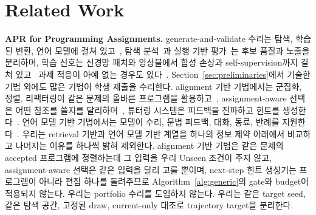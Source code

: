\documentclass[10pt,conference]{IEEEtran}
\begin{document}
\section{Related Work}
\label{sec:related}
\noindent\textbf{APR for Programming Assignments.} generate-and-validate 수리는 탐색, 학습된 변환, 언어 모델에 걸쳐 있고~\cite{gazzola2019automatic,monperrus2018automatic,weimer2009automatically,legoues2012genprog}, 탐색 분석~\cite{qi2014strength}과 실행 기반 평가~\cite{haque2023fixeval,chen2021evaluating}는 후보 품질과 노출을 분리하며, 학습 신호는 신경망 패치와 앙상블에서 합성 손상과 self-supervision까지 걸쳐 있고~\cite{tufano2019empirical,lutellier2020coconut,yasunaga2021break,ye2022selfapr} 과제 적응이 아예 없는 경우도 있다~\cite{xia2022less,jiang2023impact}. Section~\ref{sec:preliminaries}에서 기술한 기법 외에도 많은 기법이 학생 제출을 수리한다. alignment 기반 기법에서는 군집화, 정렬, 리팩터링이 같은 문제의 올바른 프로그램을 활용하고~\cite{gulwani2018automated,wang2018search,hu2019re}, assignment-aware 선택은 어떤 참조를 쓸지를 달리하며~\cite{heo2023referent,choi2021automated,choi2025automated}, 튜터링 시스템은 피드백을 전파하고 힌트를 생성한다~\cite{piech2015embeddings,glassman2015overcode,rivers2017data,price2017isnap}. 언어 모델 기반 기법에서는 모델이 수리, 문법 피드백, 대화, 동료, 반례를 지원한다~\cite{joshi2023repair,zhang2024pydex,phung2023generating,liu2024fastfixer,yang2024cref,zhao2026peer,orvalho2025counterexample}. 우리는 retrieval 기반과 언어 모델 기반 계열을 하나의 정보 제약 아래에서 비교하고 나머지는 이유를 하나씩 밝혀 제외한다. alignment 기반 기법은 같은 문제의 accepted 프로그램에 정렬하는데 그 입력을 우리 Unseen 조건이 주지 않고, assignment-aware 선택은 같은 입력을 달리 고를 뿐이며, next-step 힌트 생성기는 프로그램이 아니라 편집 하나를 돌려주므로 Algorithm~\ref{alg:generic}의 gate와 budget이 적용되지 않는다. 우리는 portfolio 수리를 도입하지 않는다. 우리는 같은 target seed, 같은 탐색 공간, 고정된 draw, current-only 대조로 trajectory target을 분리한다.
\end{document}
